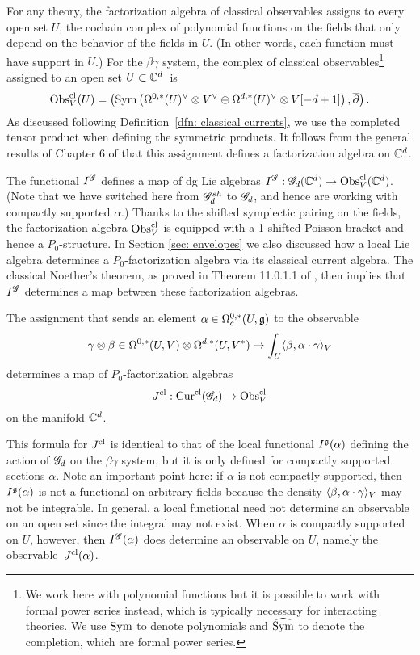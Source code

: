 For any theory, the factorization algebra of classical observables assigns to every open set $U$, the cochain complex of polynomial functions on the fields that only depend on the behavior of the fields in $U$.
(In other words, each function must have support in $U$.)  
For the $\beta\gamma$ system, the complex of classical observables\footnote{We work here with polynomial functions but it is possible to work with formal power series instead, which is typically necessary for interacting theories. We use ${\rm Sym}$ to denote polynomials and $\widehat{{\rm Sym}}$ to denote the completion, which are formal power series.} assigned to an open set $U \subset \mathbb C^d$~is
\[
{\rm Obs}^{{\rm cl}}_V(U) = \left({\rm Sym} \left(\Omega^{0,*}(U)^\vee \otimes V^\vee \oplus \Omega^{d,*}(U)^\vee \otimes V [-d+1]\right), \overline{\partial}\right) .
\]
As discussed following Definition~\ref{dfn: classical currents}, we use the completed tensor product when defining the symmetric products. 
It follows from the general results of Chapter 6 of \cite{CG2} that this assignment defines a factorization algebra on $\mathbb C^d$. 

The functional $I^{\mathscr G}$ defines a map of dg Lie algebras $I^{\mathscr G} : \mathscr G_d(\mathbb C^d) \to {\rm Obs}^{{\rm cl}}_V(\mathbb C^d)$.
(Note  that we have switched here from $\mathscr G^{sh}_d$ to $\mathscr G_d$, and hence are working with compactly supported $\alpha$.)
Thanks to the shifted symplectic pairing on the fields, 
the factorization algebra ${\rm Obs}_V^{{\rm cl}}$ is equipped with a 1-shifted Poisson bracket and hence a $P_0$-structure. 
In Section \ref{sec: envelopes} we also discussed how a local Lie algebra determines a $P_0$-factorization algebra via its classical current algebra. 
The classical Noether's theorem, as proved in Theorem 11.0.1.1 of \cite{CG2}, then implies that $I^{\mathscr G}$ determines a map between these factorization algebras. 

\begin{prop}
\label{prop:CNT}
The assignment that sends an element $\alpha \in \Omega^{0,*}_c(U, \mathfrak g)$ to the observable
\[
\gamma \otimes \beta \in \Omega^{0,*}(U, V) \otimes \Omega^{d,*}(U, V^*) \mapsto \int_U \langle\beta, \alpha \cdot \gamma\rangle_V
\]
determines a map of $P_0$-factorization algebras 
\[
J^{{\rm cl}} : {\rm Cur}^{{\rm cl}} (\mathscr G_d) \to {\rm Obs}^{{\rm cl}}_V 
\]
on the manifold $\mathbb C^d$.
\end{prop}

This formula for $J^{{\rm cl}}$ is identical to that of the local functional $I^\mathfrak g(\alpha)$ defining the action of $\mathscr G_d$ on the $\beta\gamma$ system,
but it is only defined for compactly supported sections $\alpha$.
Note an important point here: if $\alpha$ is not compactly supported, then $I^\mathfrak g(\alpha)$ is not a functional on arbitrary fields because the density $\langle\beta, \alpha \cdot \gamma\rangle_V$ may not be integrable.
In general, a local functional need not determine an observable on an open set since the integral may not exist.
When $\alpha$ is compactly supported on $U$, however, then $I^\mathscr G (\alpha)$ does determine an observable on $U$, namely the observable~$J^{{\rm cl}}(\alpha)$. 

